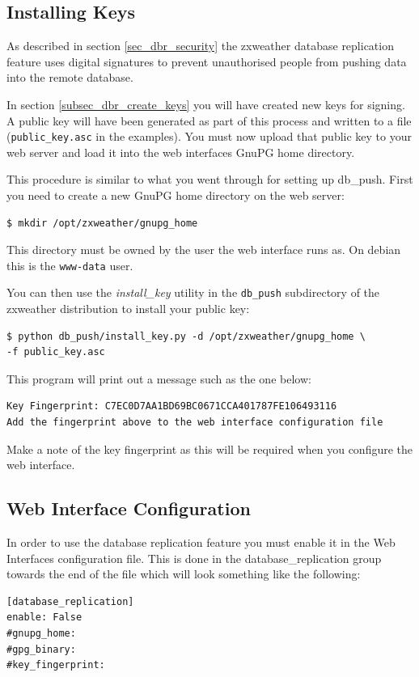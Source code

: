 \documentclass[a4paper,10pt,draft]{book}
\begin{document}
\subsection{Installing Keys}
\label{sec_dbr_installing_keys}
As described in section \ref{sec_dbr_security} the zxweather database replication feature uses digital signatures to prevent unauthorised people from pushing data into the remote database.

In section \ref{subsec_dbr_create_keys} you will have created new keys for signing. A public key will have been generated as part of this process and written to a file (\verb|public_key.asc| in the examples). You must now upload that public key to your web server and load it into the web interfaces GnuPG home directory.

This procedure is similar to what you went through for setting up db\_push. First you need to create a new GnuPG home directory on the web server:
\begin{verbatim}
$ mkdir /opt/zxweather/gnupg_home
\end{verbatim}

This directory must be owned by the user the web interface runs as. On debian this is the \verb|www-data| user.

You can then use the \emph{install\_key} utility in the \verb|db_push| subdirectory of the zxweather distribution to install your public key:

\begin{verbatim}
$ python db_push/install_key.py -d /opt/zxweather/gnupg_home \
-f public_key.asc
\end{verbatim}

This program will print out a message such as the one below:
\begin{verbatim}
Key Fingerprint: C7EC0D7AA1BD69BC0671CCA401787FE106493116
Add the fingerprint above to the web interface configuration file
\end{verbatim}

Make a note of the key fingerprint as this will be required when you configure the web interface.

\label{sec_dbr_web_setup}
\subsection{Web Interface Configuration}

In order to use the database replication feature you must enable it in the Web Interfaces configuration file. This is done in the database\_replication group towards the end of the file which will look something like the following:
\begin{verbatim}
[database_replication]
enable: False
#gnupg_home:
#gpg_binary:
#key_fingerprint: 
\end{verbatim}
\end{document}

